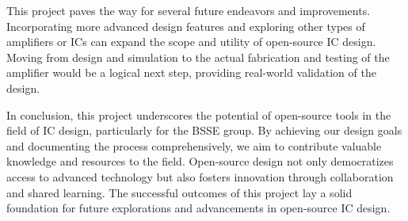 This project paves the way for several future endeavors and improvements. Incorporating more advanced design features and exploring other types of amplifiers or ICs can expand the scope and utility of open-source IC design. Moving from design and simulation to the actual fabrication and testing of the amplifier would be a logical next step, providing real-world validation of the design.

In conclusion, this project underscores the potential of open-source tools in the field of IC design, particularly for the BSSE group. By achieving our design goals and documenting the process comprehensively, we aim to contribute valuable knowledge and resources to the field. Open-source design not only democratizes access to advanced technology but also fosters innovation through collaboration and shared learning. The successful outcomes of this project lay a solid foundation for future explorations and advancements in open-source IC design.